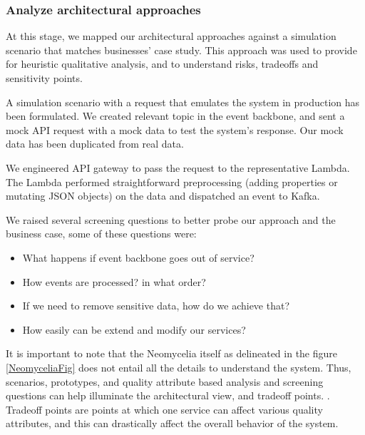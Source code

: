 \documentclass[10pt, conference]{IEEEtran}
\begin{document}
\subsubsection{Analyze architectural approaches}

At this stage, we mapped our architectural approaches against a simulation scenario that matches businesses' case study. This approach was used to provide for heuristic qualitative analysis, and to understand risks, tradeoffs and sensitivity points.

A simulation scenario with a request that emulates the system in production has been formulated. We created relevant topic in the event backbone, and sent a mock API request with a mock data to test the system's response. Our mock data has been duplicated from real data.

We engineered API gateway to pass the request to the representative Lambda. The Lambda performed straightforward preprocessing (adding properties or mutating JSON objects) on the data and dispatched an event to Kafka.

We raised several screening questions to better probe our approach and the business case, some of these questions were:

\begin{itemize}
    \item What happens if event backbone goes out of service?
    \item How events are processed? in what order?
    \item If we need to remove sensitive data, how do we achieve that?
    \item How easily can be extend and modify our services?
\end{itemize}

It is important to note that the Neomycelia itself as delineated in the figure \ref{NeomyceliaFig} does not entail all the details to understand the system. Thus, scenarios, prototypes, and quality attribute based analysis and screening questions can help illuminate the architectural view, and tradeoff points. \cite{KazmanATAM}. Tradeoff points are points at which one service can affect various quality attributes, and this can drastically affect the overall behavior of the system.

\end{document}
